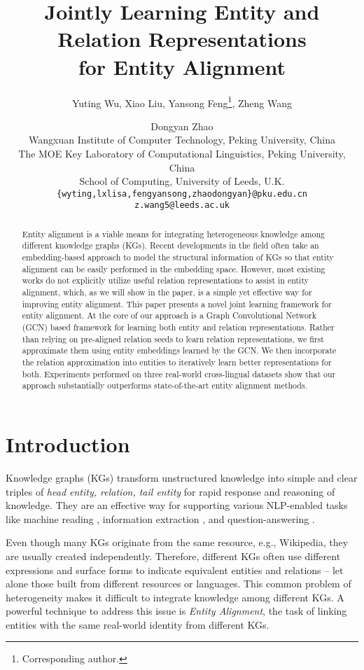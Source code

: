 \documentclass[11pt,a4paper]{article}
\title{Jointly Learning Entity and Relation Representations \\for Entity Alignment}
\author{
	Yuting Wu, 
	Xiao Liu, 
	Yansong Feng\thanks{\;\;Corresponding author.},  
	Zheng Wang \and
	Dongyan Zhao \\
	Wangxuan Institute of Computer Technology, Peking University, China\\
	The MOE Key Laboratory of Computational Linguistics, Peking University, China\\
	School of Computing, University of Leeds, U.K. \\
	{\tt \{wyting,lxlisa,fengyansong,zhaodongyan\}@pku.edu.cn} \\
	{\tt z.wang5@leeds.ac.uk}\\
}
\date{}
\begin{document}
\maketitle

	\begin{abstract} Entity alignment is a viable means for integrating heterogeneous knowledge among different knowledge graphs (KGs). Recent developments in the field often take an embedding-based approach to model the structural information of KGs so that entity alignment can be easily performed in the embedding space. However, most existing works do not explicitly utilize useful relation representations to assist in entity alignment, which, as we will show in the paper, is a simple yet effective way for improving entity alignment. This paper presents a novel joint learning framework for entity alignment. At the core of our approach is a Graph Convolutional Network (GCN) based framework for learning both entity and relation representations. Rather than relying on pre-aligned relation seeds to learn relation representations, we first approximate them using entity embeddings learned by the GCN. We then incorporate the relation approximation into entities to iteratively learn better representations for both. Experiments performed on three real-world cross-lingual datasets show that our approach substantially outperforms state-of-the-art entity alignment methods.
	
\end{abstract}

	
\section{Introduction}
\label{section:intro}
Knowledge graphs (KGs) transform unstructured knowledge into simple and clear triples of \emph{head entity, relation, tail entity}
for rapid response and reasoning of knowledge. They are an effective way for supporting various NLP-enabled tasks like machine reading \cite{yang2017kblstm}, information extraction \cite{wang2018label}, and question-answering
\cite{zhang2018variational}.

Even though many KGs originate from the same resource, e.g., Wikipedia, they are usually created independently. Therefore, different KGs often use different expressions and surface forms to
indicate equivalent entities and relations -- let alone
those built from different resources or languages. This common problem of heterogeneity makes it difficult to integrate knowledge among different KGs. 
A powerful technique to address this issue is \emph{Entity Alignment}, the task of linking entities with the same real-world identity from
different KGs.
\end{document}
